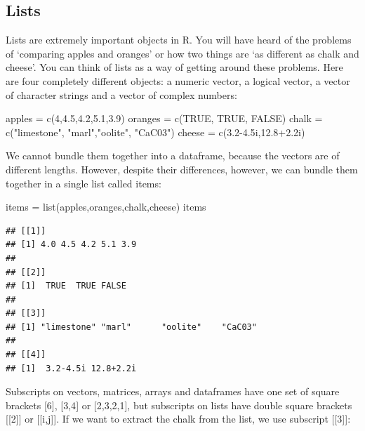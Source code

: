 \documentclass[
]{book}
\newenvironment{Shaded}{\begin{snugshade}}{\end{snugshade}}
\newcommand{\ConstantTok}[1]{\textcolor[rgb]{0.00,0.00,0.00}{#1}}
\newcommand{\DecValTok}[1]{\textcolor[rgb]{0.00,0.00,0.81}{#1}}
\newcommand{\FloatTok}[1]{\textcolor[rgb]{0.00,0.00,0.81}{#1}}
\newcommand{\FunctionTok}[1]{\textcolor[rgb]{0.00,0.00,0.00}{#1}}
\newcommand{\NormalTok}[1]{#1}
\newcommand{\OtherTok}[1]{\textcolor[rgb]{0.56,0.35,0.01}{#1}}
\newcommand{\StringTok}[1]{\textcolor[rgb]{0.31,0.60,0.02}{#1}}
\begin{document}
\hypertarget{lists}{%
\subsection{Lists}\label{lists}}

Lists are extremely important objects in R. You will have heard of the problems of `comparing apples and oranges' or how two things are `as different as chalk and cheese'. You can think of lists as a way of getting around these problems. Here are four completely different objects: a numeric vector, a logical vector, a vector of character strings and a vector of complex numbers:

\begin{Shaded}
\begin{Highlighting}[]
\NormalTok{apples }\OtherTok{=} \FunctionTok{c}\NormalTok{(}\DecValTok{4}\NormalTok{,}\FloatTok{4.5}\NormalTok{,}\FloatTok{4.2}\NormalTok{,}\FloatTok{5.1}\NormalTok{,}\FloatTok{3.9}\NormalTok{)}
\NormalTok{oranges }\OtherTok{=} \FunctionTok{c}\NormalTok{(}\ConstantTok{TRUE}\NormalTok{, }\ConstantTok{TRUE}\NormalTok{, }\ConstantTok{FALSE}\NormalTok{)}
\NormalTok{chalk }\OtherTok{=} \FunctionTok{c}\NormalTok{(}\StringTok{"limestone"}\NormalTok{, }\StringTok{"marl"}\NormalTok{,}\StringTok{"oolite"}\NormalTok{, }\StringTok{"CaC03"}\NormalTok{)}
\NormalTok{cheese }\OtherTok{=} \FunctionTok{c}\NormalTok{(}\FloatTok{3.2{-}4.5}\NormalTok{i,}\FloatTok{12.8+2.2}\NormalTok{i)}
\end{Highlighting}
\end{Shaded}

We cannot bundle them together into a dataframe, because the vectors are of different lengths. However, despite their differences, however, we can bundle them together in a single list called items:

\begin{Shaded}
\begin{Highlighting}[]
\NormalTok{items }\OtherTok{=} \FunctionTok{list}\NormalTok{(apples,oranges,chalk,cheese)}
\NormalTok{items}
\end{Highlighting}
\end{Shaded}

\begin{verbatim}
## [[1]]
## [1] 4.0 4.5 4.2 5.1 3.9
## 
## [[2]]
## [1]  TRUE  TRUE FALSE
## 
## [[3]]
## [1] "limestone" "marl"      "oolite"    "CaC03"    
## 
## [[4]]
## [1]  3.2-4.5i 12.8+2.2i
\end{verbatim}

Subscripts on vectors, matrices, arrays and dataframes have one set of square brackets {[}6{]}, {[}3,4{]} or {[}2,3,2,1{]}, but subscripts on lists have double square brackets {[}{[}2{]}{]} or {[}{[}i,j{]}{]}. If we want to extract the chalk from the list, we use subscript {[}{[}3{]}{]}:
\end{document}
